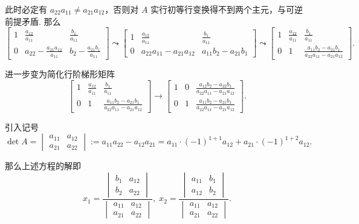 \documentclass[10pt,openany]{article}
\theoremstyle{thmstyle} %
\theoremstyle{defstyle} %
\theoremstyle{prostyle} %
\theoremstyle{exastyle}
\theoremstyle{remstyle}
\begin{document}
此时必定有 \( a_{22}a_{11} \neq a_{21} a_{12} \)，否则对 \( A \) 实行初等行变换得不到两个主元，与可逆前提矛盾. 那么
\[ \begin{bmatrix}
	1 & \frac{a_{12}}{a_{11}} & \frac{b_1}{a_{11}} \\[2ex]
	0 & a_{22} - \frac{a_{21} a_{12}}{a_{11}} & b_2 - \frac{a_{21} b_1}{a_{11}}
\end{bmatrix} \leadsto \begin{bmatrix}
1 & \frac{a_{12}}{a_{11}} & \frac{b_1}{a_{11}} \\[2ex]
0 & a_{22}a_{11} - a_{21} a_{12} & a_{11} b_2 - a_{21} b_1
\end{bmatrix} \leadsto \begin{bmatrix}
1 & \frac{a_{12}}{a_{11}} & \frac{b_1}{a_{11}} \\[2ex]
0 & 1 & \frac{a_{11} b_2 - a_{21} b_1}{a_{22}a_{11} - a_{21} a_{12}}
\end{bmatrix}. \]

进一步变为简化行阶梯形矩阵
\[ \begin{bmatrix}
	1 & \frac{a_{12}}{a_{11}} & \frac{b_1}{a_{11}} \\[2ex]
	0 & 1 & \frac{a_{11} b_2 - a_{21} b_1}{a_{22}a_{11} - a_{21} a_{12}}
\end{bmatrix} \to \begin{bmatrix}
1 & 0 & \frac{a_{12} b_2 - a_{22} b_1}{a_{22}a_{11} - a_{21} a_{12}} \\[2ex]
0 & 1 & \frac{a_{11} b_2 - a_{21} b_1}{a_{22}a_{11} - a_{21} a_{12}}
\end{bmatrix}. \]

引入记号
\[ \det A=\begin{vmatrix}
	a_{11} & a_{12} \\ a_{21} & a_{22}
\end{vmatrix}:= a_{11}a_{22}-a_{12}a_{21}=a_{11}\cdot (-1)^{1+1}a_{12}+a_{21} \cdot (-1)^{1+2}a_{12}. \]

那么上述方程的解即
\[ x_1=\frac{\begin{vmatrix}
		b_1 & a_{12} \\ b_2 & a_{22}
\end{vmatrix}}{\begin{vmatrix}
		a_{11} & a_{12} \\ a_{21} & a_{22}
\end{vmatrix}}, \; x_2=\frac{\begin{vmatrix}
a_{11} & b_1 \\ a_{12} & b_2
\end{vmatrix}}{\begin{vmatrix}
a_{11} & a_{12} \\ a_{21} & a_{22}
\end{vmatrix}}. \]
\end{document}
